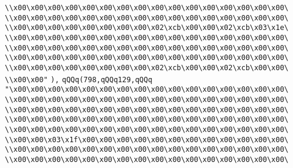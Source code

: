 \verb|\\x00\x00\x00\x00\x00\x00\x00\x00\x00\x00\x00\x00\x00\x00\x00\x00\|\newline
\verb|\\x00\x00\x00\x00\x00\x00\x00\x00\x00\x00\x00\x00\x00\x00\x00\x00\|\newline
\verb|\\x00\x00\x00\x00\x00\x00\x00\x00\x02\xcb\x00\x00\x02\xcb\x03\x1e\|\newline
\verb|\\x00\x00\x00\x00\x00\x00\x00\x00\x00\x00\x00\x00\x00\x00\x00\x00\|\newline
\verb|\\x00\x00\x00\x00\x00\x00\x00\x00\x00\x00\x00\x00\x00\x00\x00\x00\|\newline
\verb|\\x00\x00\x00\x00\x00\x00\x00\x00\x00\x00\x00\x00\x00\x00\x00\x00\|\newline
\verb|\\x00\x00\x00\x00\x00\x00\x00\x00\x02\xcb\x00\x00\x02\xcb\x00\x00\|\newline
\verb|\\x00\x00"|\newline
\verb|),|\newline
\verb|qQQq(798,qQQq129,qQQq|\newline
\verb|"\x00\x00\x00\x00\x00\x00\x00\x00\x00\x00\x00\x00\x00\x00\x00\x00\|\newline
\verb|\\x00\x00\x00\x00\x00\x00\x00\x00\x00\x00\x00\x00\x00\x00\x00\x00\|\newline
\verb|\\x00\x00\x00\x00\x00\x00\x00\x00\x00\x00\x00\x00\x00\x00\x00\x00\|\newline
\verb|\\x00\x00\x00\x00\x00\x00\x00\x00\x00\x00\x00\x00\x00\x00\x00\x00\|\newline
\verb|\\x00\x00\x00\x00\x00\x00\x00\x00\x00\x00\x00\x00\x00\x00\x00\x00\|\newline
\verb|\\x00\x00\x03\x1f\x00\x00\x00\x00\x00\x00\x00\x00\x00\x00\x00\x00\|\newline
\verb|\\x00\x00\x00\x00\x00\x00\x00\x00\x00\x00\x00\x00\x00\x00\x00\x00\|\newline
\verb|\\x00\x00\x00\x00\x00\x00\x00\x00\x00\x00\x00\x00\x00\x00\x00\x00\|\newline
